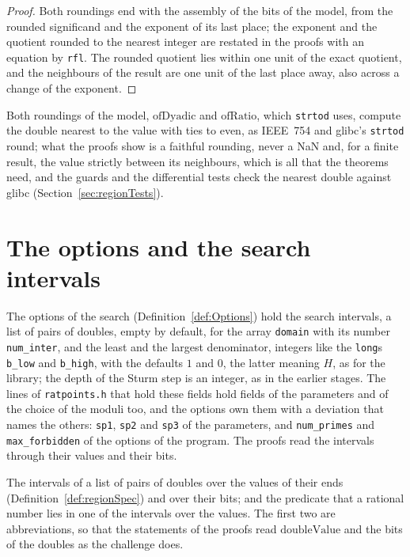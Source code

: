 \begin{proof}
  \leanok
  Both roundings end with the assembly of the bits of the model, from the rounded significand and
  the exponent of its last place; the exponent and the quotient rounded to the nearest integer are
  restated in the proofs with an equation by \verb|rfl|. The rounded quotient lies within one unit
  of the exact quotient, and the neighbours of the result are one unit of the last place away, also
  across a change of the exponent.
\end{proof}

Both roundings of the model, $\mathrm{ofDyadic}$ and $\mathrm{ofRatio}$, which \verb|strtod| uses,
compute the double nearest to the value with ties to even, as IEEE~754 and glibc's \verb|strtod|
round; what the proofs show is a faithful rounding, never a NaN and, for a finite result, the value
strictly between its neighbours, which is all that the theorems need, and the guards and the
differential tests check the nearest double against glibc (Section~\ref{sec:regionTests}).

\section{The options and the search intervals}\label{sec:regionOptions}

The options of the search (Definition~\ref{def:Options}) hold the search intervals, a list of pairs
of doubles, empty by default, for the array \verb|domain| with its number \verb|num_inter|, and the
least and the largest denominator, integers like the \verb|long|s \verb|b_low| and \verb|b_high|,
with the defaults $1$ and $0$, the latter meaning $H$, as for the library; the depth of the Sturm
step is an integer, as in the earlier stages. The lines of \verb|ratpoints.h| that hold these
fields hold fields of the parameters and of the choice of the moduli too, and the options own them
with a deviation that names the others: \verb|sp1|, \verb|sp2| and \verb|sp3| of the parameters,
and \verb|num_primes| and \verb|max_forbidden| of the options of the program. The proofs
read the intervals through their values and their bits.

\begin{definition}\label{def:inIntervals}
  \leanok
  The intervals of a list of pairs of doubles over the values of their ends
  (Definition~\ref{def:regionSpec}) and over their bits; and the predicate that a rational number
  lies in one of the intervals over the values. The first two are abbreviations, so that the
  statements of the proofs read $\mathrm{doubleValue}$ and the bits of the doubles as the challenge
  does.
\end{definition}

